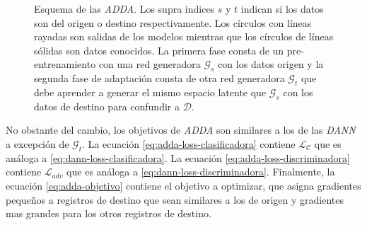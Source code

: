 \begin{figure}[H]
  \caption[Esquema de {\it ADDA}]{Esquema de las {\it ADDA}. Los supra indices $s$ y $t$ indican si los datos son del origen o destino respectivamente.
    Los círculos con líneas rayadas son salidas de los modelos mientras que los círculos de líneas sólidas son datos conocidos.
    La primera fase consta de un pre-entrenamiento con una red generadora $\mathcal{G}_s$ con los datos origen y la segunda fase de adaptación
    consta de otra red generadora $\mathcal{G}_t$ que debe aprender a generar el mismo espacio latente que $\mathcal{G}_s$ con los datos de destino para confundir a $\mathcal{D}$.}
  \label{fig:adda-esquema}
\end{figure}

No obstante del cambio, los objetivos de {\it ADDA} son similares a los de las {\it DANN} a excepción de
$\mathcal{G}_t$. La ecuación \ref{eq:adda-loss-clasificadora} contiene $\mathcal{L}_\mathcal{C}$ que es análoga a
\ref{eq:dann-loss-clasificadora}. La ecuación \ref{eq:adda-loss-discriminadora} contiene $\mathcal{L}_{adv}$ que es
análoga a \ref{eq:dann-loss-discriminadora}. Finalmente, la ecuación \ref{eq:adda-objetivo} contiene el objetivo a
optimizar, que asigna gradientes pequeños a registros de destino que sean similares a los de origen y gradientes mas
grandes para los otros registros de destino.

